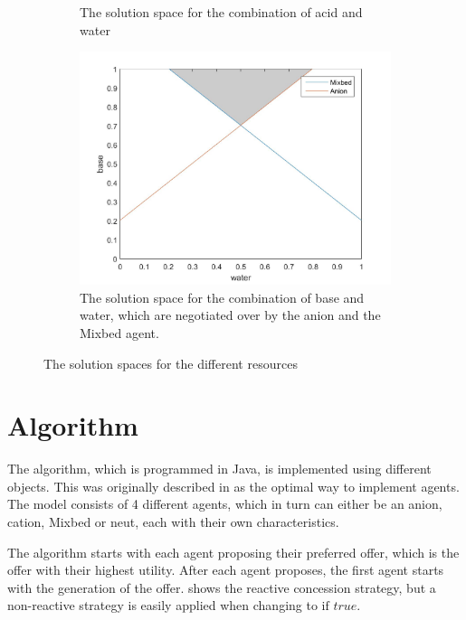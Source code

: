 \begin{figure}[h]
{\begin{subfigure}[b]{0.7\textwidth}
		\caption{The solution space for the combination of acid and water}
		\label{fig:solutionwateracid}
	\end{subfigure}
}
	
	\centering
	\begin{subfigure}[b]{0.7\textwidth}
		\centering
		\includegraphics[width=\linewidth]{img/reservationcurve_water_base}
		\caption{The solution space for the combination of base and water, which are negotiated over by the anion and the Mixbed agent.}
		\label{fig:solutionwaterbase}
	\end{subfigure}

	\caption{The solution spaces for the different resources}\label{fig:solutionspace} 
\end{figure}

\clearpage
\section{Algorithm}
The algorithm, which is programmed in Java, is implemented using different objects. This was originally described in  as the optimal way to implement agents. The model consists of 4 different agents, which in turn can either be an anion, cation, Mixbed or neut, each with their own characteristics.

The algorithm starts with each agent proposing their preferred offer, which is the offer with their highest utility. After each agent proposes, the first agent starts with the generation of the offer.  shows the reactive concession strategy, but a non-reactive strategy is easily applied when changing  to $\text{if } true$.

